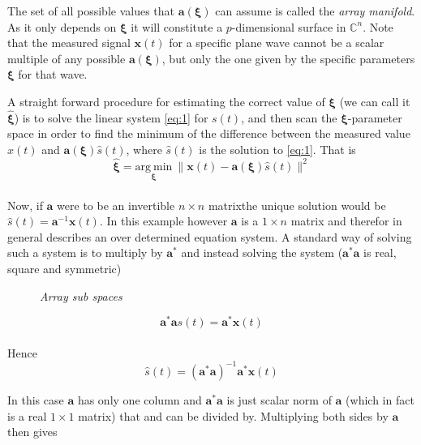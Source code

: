 \documentclass[11pt]{article}
\renewcommand{\vct}[1]{\boldsymbol{#1}}
\begin{document}
The set of all possible values that $\vct{a}(\vct{\xi})$ can assume is called the \textit{array manifold}. As it only depends on $\vct{\xi}$ it will constitute a $p$-dimensional surface in $\mathbb C^n$. Note that the measured signal $\vct{x}(t)$ for a specific plane wave cannot be a scalar multiple of any possible $\vct{a}(\vct{\xi})$, but only the one given by the specific parameters $\vct{\xi}$ for that wave.

A straight forward procedure for estimating the correct value of $\vct{\xi}$ (we can call it $\hat{\vct{\xi}}$) is to solve the linear system \eqref{eq:1} for $s(t)$, and then scan the $\vct{\xi}$-parameter space in order to find the minimum of the difference between the measured value $x(t)$ and $\vct{a}(\vct{\xi})\hat{s}(t)$, where $\hat{s}(t)$ is the solution to \eqref{eq:1}. That is
\begin{equation}\label{eq:2}
\hat{\vct{\xi}}=\underset{\vct{\xi}}{\mathrm{arg\ min}}\ \|\vct{x}(t) - \vct{a}(\vct{\xi})\hat{s}(t)\|^2
\end{equation}
\\
Now, if $\vct{a}$ were to be an invertible $n\times n$ matrix\footnotemark the unique solution would be $\hat{s}(t)=\vct{a}^{-1}\vct{x}(t)$. In this example however $\vct{a}$ is a $1\times n$ matrix and therefor in general describes an over determined equation system. A standard way of solving such a system is to multiply by $\vct{a}^*$ and instead solving the system ($\vct{a}^*\vct{a}$ is real, square and symmetric)

\begin{figure}[t]
    \def\svgwidth{250}
    
    \centering
    \caption{\textit{Array sub spaces}}
    \label{fig:subspace1dim}
\end{figure}


\begin{equation}
    \vct{a}^*\vct{a}s(t) = \vct{a}^*\vct{x}(t)
\end{equation}
\\
Hence
\begin{equation}
    \hat{s}(t) = (\vct{a}^*\vct{a})^{-1}\vct{a}^*\vct{x}(t)
\end{equation}

In this case $\vct{a}$ has only one column and $\vct{a}^*\vct{a}$ is just scalar norm of $\vct{a}$ (which in fact is a real $1\times 1$ matrix) that and can be divided by. Multiplying both sides by $\vct{a}$ then gives
\end{document}
